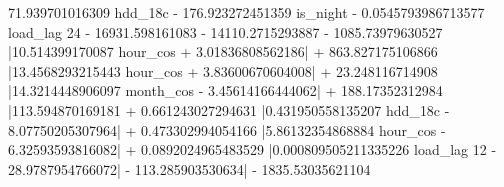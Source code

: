 71.939701016309 hdd_{18c} - 176.923272451359 is_{night} - 0.0545793986713577 load_{lag 24} - 16931.598161083  - 14110.2715293887  - 1085.73979630527 \left|{10.514399170087 hour_{cos} + 3.01836808562186}\right| + 863.827175106866 \left|{13.4568293215443 hour_{cos} + 3.83600670604008}\right| + 23.248116714908 \left|{14.3214448906097 month_{cos} - 3.45614166444062}\right| + 188.17352312984 \left|{113.594870169181  + 0.661243027294631 \left|{0.431950558135207 hdd_{18c} - 8.07750205307964}\right| + 0.473302994054166 \left|{5.86132354868884 hour_{cos} - 6.32593593816082}\right| + 0.0892024965483529 \left|{0.000809505211335226 load_{lag 12} - 28.9787954766072}\right| - 113.285903530634}\right| - 1835.53035621104